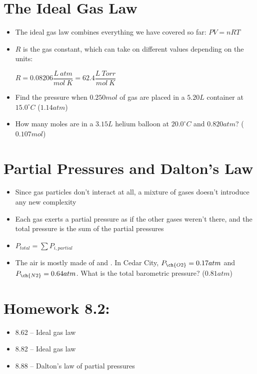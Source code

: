 \documentclass[12pt, openany, letterpaper]{memoir}
\begin{document}
\section{The Ideal Gas Law}
\begin{itemize}
	\item The ideal gas law combines everything we have covered so far: $PV=nRT$
	\item $R$ is the gas constant, which can take on different values depending on the units:

	      $R=0.08206\dfrac{L~atm}{mol~K} = 62.4\dfrac{L~Torr}{mol~K}$
	\item Find the pressure when $0.250mol$ of gas are placed in a $5.20L$ container at $15.0^\circ C$ ($1.14atm$)
	\item How many moles are in a $3.15L$ helium balloon at $20.0^\circ C$ and $0.820atm$? ($0.107mol$)
\end{itemize}

\section{Partial Pressures and Dalton's Law}
\begin{itemize}
	\item Since gas particles don't interact at all, a mixture of gases doesn't introduce any new complexity
	\item Each gas exerts a partial pressure as if the other gases weren't there, and the total pressure is the sum of the partial pressures
	\item $P_{total} = \sum P_{i, partial}$
	\item The air is mostly made of  and . In Cedar City, $P_{\ch{O2}}=0.17atm$ and $P_{\ch{N2}}=0.64atm$. What is the total barometric pressure? ($0.81atm$)
\end{itemize}

\section*{Homework 8.2:}
\begin{itemize}
  \item 8.62 -- Ideal gas law
  \item 8.82 -- Ideal gas law
  \item 8.88 -- Dalton's law of partial pressures
\end{itemize}
\end{document}

